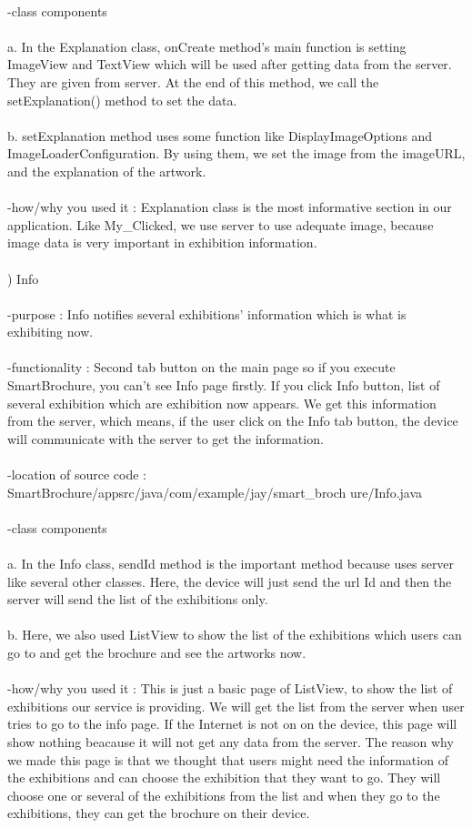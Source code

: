 \documentclass[conference]{IEEEtran}
\begin{document}
\\ -class components\\
\\ a. In the Explanation class, onCreate method's main function is setting ImageView and TextView which will be used after getting data from the server. They are given from server. At the end of this method, we call the setExplanation() method to set the data.\\
\\ b. setExplanation method uses some function like DisplayImageOptions and ImageLoaderConfiguration. By using them, we set the image from the imageURL, and the explanation of the artwork.\\
\\ -how/why you used it : Explanation class is the most informative section in our application. Like My\_Clicked, we use server to use adequate image, because image data is very important in exhibition information. \\\\
) Info\\\\
-purpose : Info notifies several exhibitions’ information which is what is exhibiting now.\\
\\ -functionality : Second tab button on the main page so if you execute SmartBrochure, you can't see Info page firstly. If you click Info button, list of several exhibition which are exhibition now appears. We get this information from the server, which means, if the user click on the Info tab button, the device will communicate with the server to get the information.\\
\\ -location of source code : SmartBrochure/appsrc/java/com/example/jay/smart\_broch
ure/Info.java\\
\\ -class components\\
\\ a. In the Info class, sendId method is the important method because uses server like several other classes. Here, the device will just send the url Id and then the server will send the list of the exhibitions only.\\
\\ b. Here, we also used ListView to show the list of the exhibitions which users can go to and get the brochure and see the artworks now.\\
\\ -how/why you used it : This is just a basic page of ListView, to show the list of exhibitions our service is providing. We will get the list from the server when user tries to go to the info page. If the Internet is not on on the device, this page will show nothing beacause it will not get any data from the server. The reason why we made this page is that we thought that users might need the information of the exhibitions and can choose the exhibition that they want to go. They will choose one or several of the exhibitions from the list and when they go to the exhibitions, they can get the brochure on their device.\\\\
\end{document}
